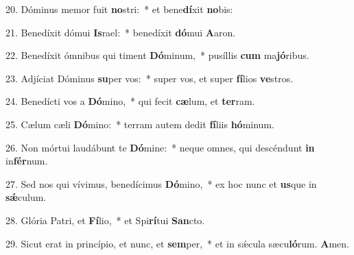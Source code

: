 \item 20. Dóminus memor fuit \textbf{no}stri:~* et bene\textbf{dí}xit \textbf{no}bis:
\item 21. Benedíxit dómui \textbf{Is}rael:~* benedíxit \textbf{dó}mui \textbf{A}aron.
\item 22. Benedíxit ómnibus qui timent \textbf{Dó}minum,~* pusíllis \textbf{cum} ma\textbf{jó}ribus.
\item 23. Adjíciat Dóminus \textbf{su}per vos:~* super vos, et super \textbf{fí}lios \textbf{ve}stros.
\item 24. Benedícti vos a \textbf{Dó}mino,~* qui fecit \textbf{cæ}lum, et \textbf{ter}ram.
\item 25. Cælum cæli \textbf{Dó}mino:~* terram autem dedit \textbf{fí}liis \textbf{hó}minum.
\item 26. Non mórtui laudábunt te \textbf{Dó}mine:~* neque omnes, qui descéndunt \textbf{in} in\textbf{fér}num.
\item 27. Sed nos qui vívimus, benedícimus \textbf{Dó}mino,~* ex hoc nunc et \textbf{us}que in \textbf{sǽ}culum.
\item 28. Glória Patri, et \textbf{Fí}lio,~* et Spi\textbf{rí}tui \textbf{San}cto.
\item 29. Sicut erat in princípio, et nunc, et \textbf{sem}per,~* et in sǽcula sæcu\textbf{ló}rum. \textbf{A}men.
